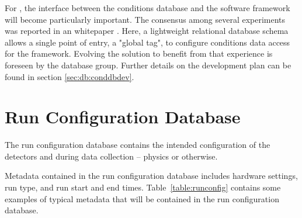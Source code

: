 \documentclass[../main-v1.tex]{subfiles}
\begin{document}
For , the interface between the conditions database and the software framework will become particularly important.  The consensus among several  experiments was reported in an  whitepaper \cite{Laycock:2019ynk}. Here, a lightweight relational database schema allows a single point of entry, a "global tag", to configure conditions data access for the framework.  Evolving the  solution to benefit from that experience is foreseen by the database group. Further details on the development plan can be found in section \ref{sec:db:conddbdev}.


\section{Run Configuration Database  }
\label{sec:db:config}  

The run configuration database contains the intended configuration of the detectors and  during data collection -- physics or otherwise. 

Metadata contained in the run configuration database includes hardware settings, run type, and run start and end times. Table~\ref{table:runconfig} contains some examples of typical metadata that will be contained in the run configuration database. 
\end{document}
